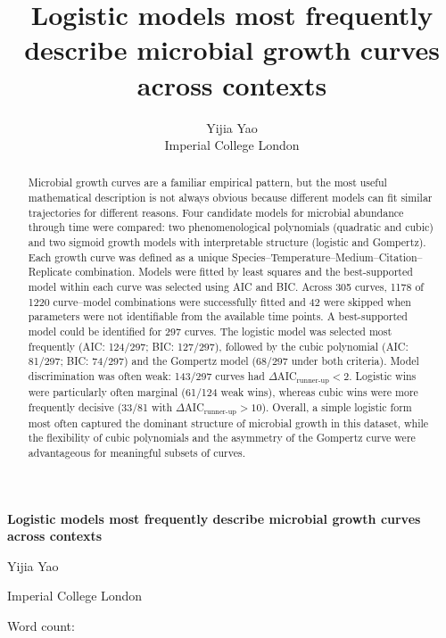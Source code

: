 \documentclass[11pt]{article}
\title{Logistic models most frequently describe microbial growth curves across contexts}
\author{Yijia Yao\\Imperial College London}
\date{}
\begin{document}
\begin{titlepage}
\centering
\vspace*{2cm}
{\LARGE \textbf{Logistic models most frequently describe microbial growth curves across contexts}\par}
\vspace{1.5cm}
{\large Yijia Yao\par}
\vspace{0.5cm}
{\large Imperial College London\par}
\vspace{1.5cm}
{\large Word count: \WordCount\par}
\vspace{1.5cm}
\begin{abstract}
Microbial growth curves are a familiar empirical pattern, but the most useful mathematical description is not always obvious because different models can fit similar trajectories for different reasons. Four candidate models for microbial abundance through time were compared: two phenomenological polynomials (quadratic and cubic) and two sigmoid growth models with interpretable structure (logistic and Gompertz). Each growth curve was defined as a unique Species--Temperature--Medium--Citation--Replicate combination. Models were fitted by least squares and the best-supported model within each curve was selected using AIC and BIC. Across 305 curves, 1178 of 1220 curve--model combinations were successfully fitted and 42 were skipped when parameters were not identifiable from the available time points. A best-supported model could be identified for 297 curves. The logistic model was selected most frequently (AIC: 124/297; BIC: 127/297), followed by the cubic polynomial (AIC: 81/297; BIC: 74/297) and the Gompertz model (68/297 under both criteria). Model discrimination was often weak: 143/297 curves had \(\Delta\)AIC\(_{\text{runner-up}}<2\). Logistic wins were particularly often marginal (61/124 weak wins), whereas cubic wins were more frequently decisive (33/81 with \(\Delta\)AIC\(_{\text{runner-up}}>10\)). Overall, a simple logistic form most often captured the dominant structure of microbial growth in this dataset, while the flexibility of cubic polynomials and the asymmetry of the Gompertz curve were advantageous for meaningful subsets of curves.
\end{abstract}
\end{titlepage}
\end{document}
